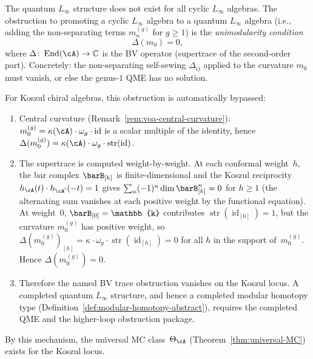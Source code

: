 \begin{remark}
\label{rem:unimodularity-obstruction}
The quantum $L_\infty$ structure does not exist for all cyclic
$L_\infty$ algebras. The obstruction to promoting a cyclic
$L_\infty$ algebra to a quantum $L_\infty$ algebra (i.e., adding
the non-separating terms $m_n^{(g)}$ for $g \geq 1$) is the
\emph{unimodularity condition}
\begin{equation}\label{eq:unimodularity}
\Delta(m_0) = 0,
\end{equation}
where $\Delta\colon \operatorname{End}(\cA) \to \mathbb{C}$ is the
BV operator (supertrace of the second-order part).
Concretely: the non-separating self-sewing $\Delta_{ij}$ applied to
the curvature $m_0$ must vanish, or else the genus-$1$ QME has no
solution.

For Koszul chiral algebras, this obstruction is automatically
bypassed:
\begin{enumerate}[label=\textup{(\alph*)}]
\item Central curvature
 (Remark~\ref{rem:voa-central-curvature}):
 $m_0^{(g)} = \kappa(\cA) \cdot \omega_g \cdot \operatorname{id}$
 is a scalar multiple of the identity, hence
 $\Delta(m_0^{(g)}) = \kappa(\cA) \cdot \omega_g
 \cdot \operatorname{str}(\operatorname{id})$.
\item The supertrace is computed weight-by-weight.
 At each conformal weight~$h$, the bar complex
 $\barB_{[h]}$ is finite-dimensional and the Koszul
 reciprocity $h_{\cA}(t) \cdot h_{\cA^!}(-t) = 1$
 \cite[Theorem~3.5.1]{LV12} gives
 $\sum_n (-1)^n \dim \barB^n_{[h]} = 0$ for $h \geq 1$
 (the alternating sum vanishes at each positive weight by
 the functional equation). At weight~$0$,
 $\barB_{[0]} = \mathbb{k}$ contributes
 $\operatorname{str}(\operatorname{id}_{[0]}) = 1$, but
 the curvature $m_0^{(g)}$ has positive weight, so
 $\Delta(m_0^{(g)})_{[h]} = \kappa \cdot \omega_g \cdot
 \operatorname{str}(\operatorname{id}_{[h]}) = 0$
 for all $h$ in the support of~$m_0^{(g)}$.
 Hence $\Delta(m_0^{(g)}) = 0$.
 \item Therefore the named BV trace obstruction vanishes on the
 Koszul locus. A completed quantum $L_\infty$ structure, and hence a
 completed modular homotopy type
 (Definition~\ref{def:modular-homotopy-abstract}), requires the
 completed QME and the higher-loop obstruction package.
\end{enumerate}
By this mechanism, the universal MC
class~$\Theta_\cA$
(Theorem~\ref{thm:universal-MC}) exists for the Koszul locus.
\end{remark}

